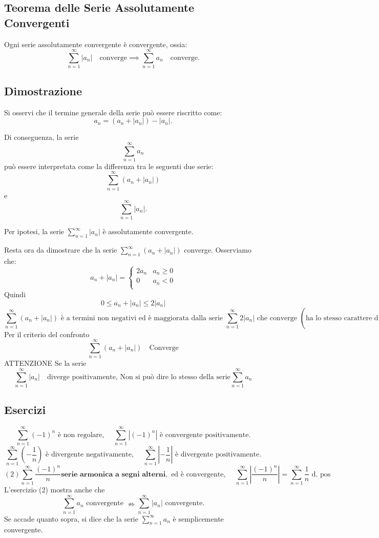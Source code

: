 \documentclass{article}
\begin{document}
\subsection*{Teorema delle Serie Assolutamente Convergenti}
Ogni serie assolutamente convergente è convergente, ossia: 
\[
    \sum_{n=1}^{\infty} |a_n| \quad \text{converge} \implies \sum_{n=1}^{\infty} a_n \quad \text{converge}.
\]

\subsection*{Dimostrazione}

Si osservi che il termine generale della serie può essere riscritto come:
\[
    a_n = \left( a_n + |a_n| \right) - |a_n|. \tag{2}
\]

Di conseguenza, la serie 
\[
    \sum_{n=1}^\infty a_n
\]
può essere interpretata come la differenza tra le seguenti due serie:
\[
    \sum_{n=1}^\infty \left( a_n + |a_n| \right) \tag{3}
\]
e
\[
    \sum_{n=1}^\infty |a_n|. \tag{4}
\]

Per ipotesi, la serie \(\sum_{n=1}^\infty |a_n|\) è assolutamente convergente.

Resta ora da dimostrare che la serie \(\sum_{n=1}^\infty \left( a_n + |a_n| \right)\) converge.  
Osserviamo che:
\[
    a_n + |a_n|= \begin{cases}
        2a_n & a_n \geq 0 \\
        0 & a_n <0 \\
    \end{cases}
\]
Quindi 
\[
      0 \leq  a_n + |a_n| \leq 2|a_n|
\]
\[
\sum_{n=1}^\infty \left( a_n + |a_n| \right) \text{ è a termini non negativi ed è maggiorata dalla serie } \sum_{n=1}^\infty 2|a_n| \text{ che converge } \left( \text{ha lo stesso carattere di } \sum_{n=1}^\infty a_n \right).
\]
Per il criterio del confronto 
\[
         \sum_{n=1}^\infty \left( a_n + |a_n| \right) \quad\text{Converge}
\]
ATTENZIONE 
Se la serie 
\[
    \sum_{n=1}^\infty |a_n| \quad\text{diverge positivamente, Non si può dire lo stesso della serie} \sum_{n=1}^\infty a_n
\]
\subsection{Esercizi}
\[
\sum_{n=1}^\infty (-1)^n \text{ è non regolare, } \quad 
\sum_{n=1}^\infty \left| (-1)^n \right| \text{ è convergente positivamente.}
\]
\[
\sum_{n=1}^\infty \left(-\frac{1}{n}\right) \text{ è divergente negativamente, } \quad 
\sum_{n=1}^\infty \left| -\frac{1}{n} \right| \text{ è divergente positivamente.}
\]
\[
(2)
\sum_{n=1}^\infty \frac{(-1)^n}{n}  \textbf{serie armonica a segni alterni}, \text{ ed è convergente, } \quad 
\sum_{n=1}^\infty \left| \frac{(-1)^n}{n} \right| = \sum_{n=1}^\infty \frac{1}{n} \text{ d. pos}
\]
L'esercizio (2) mostra anche che 
\[
\sum_{n=1}^\infty a_n \text{ convergente } \nRightarrow \sum_{n=1}^\infty |a_n| \text{ convergente.}
\]
Se accade quanto sopra, si dice che la serie $\sum_{n=1}^\infty a_n$ è semplicemente convergente.
\end{document}
